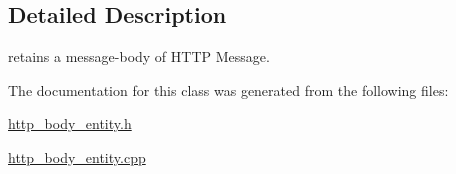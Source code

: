 \subsection{Detailed Description}
retains a message-\/body of H\-T\-T\-P Message. 

The documentation for this class was generated from the following files\-:\begin{DoxyCompactItemize}
\item 
\hyperlink{http__body__entity_8h}{http\-\_\-body\-\_\-entity.\-h}\item 
\hyperlink{http__body__entity_8cpp}{http\-\_\-body\-\_\-entity.\-cpp}\end{DoxyCompactItemize}
